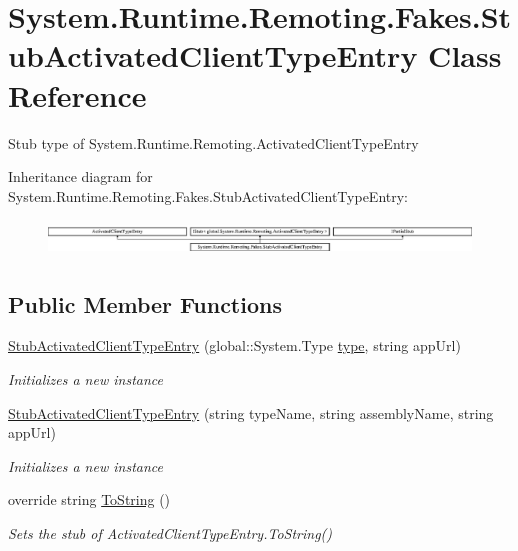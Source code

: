\hypertarget{class_system_1_1_runtime_1_1_remoting_1_1_fakes_1_1_stub_activated_client_type_entry}{\section{System.\-Runtime.\-Remoting.\-Fakes.\-Stub\-Activated\-Client\-Type\-Entry Class Reference}
\label{class_system_1_1_runtime_1_1_remoting_1_1_fakes_1_1_stub_activated_client_type_entry}
}


Stub type of System.\-Runtime.\-Remoting.\-Activated\-Client\-Type\-Entry 


Inheritance diagram for System.\-Runtime.\-Remoting.\-Fakes.\-Stub\-Activated\-Client\-Type\-Entry\-:\begin{figure}[H]
\begin{center}
\leavevmode
\includegraphics[height=0.933333cm]{class_system_1_1_runtime_1_1_remoting_1_1_fakes_1_1_stub_activated_client_type_entry}
\end{center}
\end{figure}
\subsection*{Public Member Functions}
\begin{DoxyCompactItemize}
\item 
\hyperlink{class_system_1_1_runtime_1_1_remoting_1_1_fakes_1_1_stub_activated_client_type_entry_aa9bdd046833b9f61cf36c4f8bb11d2b5}{Stub\-Activated\-Client\-Type\-Entry} (global\-::\-System.\-Type \hyperlink{jquery-1_810_82-vsdoc_8js_a3940565e83a9bfd10d95ffd27536da91}{type}, string app\-Url)
\begin{DoxyCompactList}\small\item\em Initializes a new instance\end{DoxyCompactList}\item 
\hyperlink{class_system_1_1_runtime_1_1_remoting_1_1_fakes_1_1_stub_activated_client_type_entry_acb182615df760f40503a39cf6fa6f8f4}{Stub\-Activated\-Client\-Type\-Entry} (string type\-Name, string assembly\-Name, string app\-Url)
\begin{DoxyCompactList}\small\item\em Initializes a new instance\end{DoxyCompactList}\item 
override string \hyperlink{class_system_1_1_runtime_1_1_remoting_1_1_fakes_1_1_stub_activated_client_type_entry_a6fcd56ac80446698d8e67ff2c1431862}{To\-String} ()
\begin{DoxyCompactList}\small\item\em Sets the stub of Activated\-Client\-Type\-Entry.\-To\-String()\end{DoxyCompactList}\end{DoxyCompactItemize}
